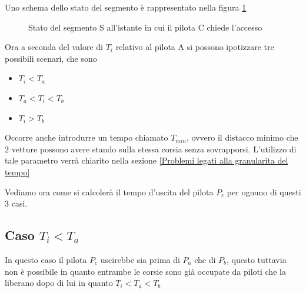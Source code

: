 \documentclass[a4paper,11pt, twoside]{book}
\begin{document}
      Uno schema dello stato del segmento è rappresentato nella figura \ref{fgr:AccessoSegmentiStatoInziale}
      
      \begin{figure}[ht]
	\centering
	\caption{Stato del segmento S all'istante in cui il pilota C chiede l'accesso}
	\label{fgr:AccessoSegmentiStatoInziale}
      \end{figure}
      
      Ora a seconda del valore di $T_i$ relativo al pilota A si possono ipotizzare tre possibili scenari, che sono
      
      \begin{itemize}
	\item $T_i < T_a$
	\item $T_a < T_i < T_b$
	\item $T_i > T_b$
      \end{itemize}
      
      Occorre anche introdurre un tempo chiamato $T_{min}$, ovvero il distacco minimo che 2 vetture possono avere
      stando sulla stessa corsia senza sovrapporsi. L'utilizzo di tale parametro verrà chiarito nella sezione
      \ref{Problemi legati alla granularita del tempo}
      
      Vediamo ora come si calcolerà il tempo d'uscita del pilota $P_c$ per ognuno di questi 3 casi.
      
      \subsection{Caso $T_i < T_a$}
	In questo caso il pilota $P_c$ uscirebbe sia prima di $P_a$ che di $P_b$, questo tuttavia non è possibile in quanto
	entrambe le corsie sono già occupate da piloti che la liberano dopo di lui in quanto $T_i < T_a < T_b$
	
\end{document}
